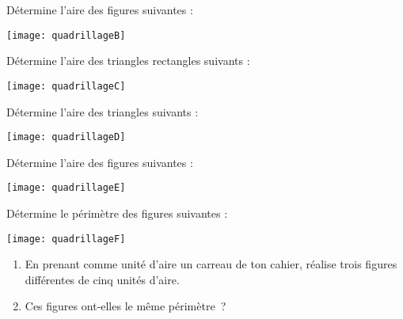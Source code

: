 \begin{exercice}
Détermine l'aire des figures suivantes :

\begin{center} \texttt{[image: quadrillageB]} \end{center}
\end{exercice}


\begin{exercice}
Détermine l'aire des triangles rectangles suivants :

\begin{center} \texttt{[image: quadrillageC]} \end{center}
\end{exercice}



\newpage



\begin{exercice}
Détermine l'aire des triangles suivants :

\begin{center} \texttt{[image: quadrillageD]} \end{center}
\end{exercice}


\begin{exercice}
Détermine l'aire des figures suivantes :

\begin{center} \texttt{[image: quadrillageE]} \end{center}
\end{exercice}


\begin{exercice}
Détermine le périmètre des figures suivantes :

\begin{center} \texttt{[image: quadrillageF]} \end{center}
\end{exercice}


\begin{exercice}
\begin{enumerate}
 \item En prenant comme unité d'aire un carreau de ton cahier, réalise trois figures différentes de cinq unités d'aire.
 \item Ces figures ont‑elles le même périmètre ?
 \end{enumerate}
\end{exercice}

